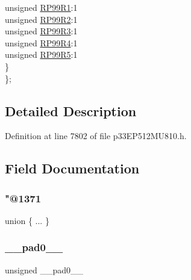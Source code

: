 \begin{DoxyCompactItemize}
\begin{tabbing}
\>\>unsigned \hyperlink{structtag_r_p_o_r8_b_i_t_s_ab28e3a4927a36855fb6f9202bf52d47a}{RP99R1}:1\\
\>\>unsigned \hyperlink{structtag_r_p_o_r8_b_i_t_s_a753303003de982fddc07a2d21901d576}{RP99R2}:1\\
\>\>unsigned \hyperlink{structtag_r_p_o_r8_b_i_t_s_a420ca3def2381327e0b876be8bac3f29}{RP99R3}:1\\
\>\>unsigned \hyperlink{structtag_r_p_o_r8_b_i_t_s_a54698f5cd3e016992c6d508c4238e086}{RP99R4}:1\\
\>\>unsigned \hyperlink{structtag_r_p_o_r8_b_i_t_s_a70eca7928afc806e2ff00df24440d258}{RP99R5}:1\\
\>\} \\
\}; \\

\end{tabbing}\end{DoxyCompactItemize}


\subsection{Detailed Description}


Definition at line 7802 of file p33\+E\+P512\+M\+U810.\+h.



\subsection{Field Documentation}
\mbox{\label{structtag_r_p_o_r8_b_i_t_s_a54bea0acf89e50007c276cd565fec2b2}} 
\subsubsection{\texorpdfstring{"@1371}{@1371}}
{\footnotesize\ttfamily union \{ ... \} }

\mbox{\label{structtag_r_p_o_r8_b_i_t_s_adf71f3d8410c1f1dbbc96680a92c49af}} 
\subsubsection{\texorpdfstring{\+\_\+\+\_\+pad0\+\_\+\+\_\+}{\_\_pad0\_\_}}
{\footnotesize\ttfamily unsigned \+\_\+\+\_\+pad0\+\_\+\+\_\+}




